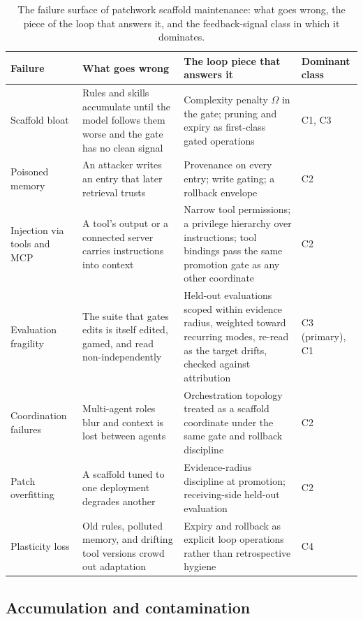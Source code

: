 \begin{table}[h]
\centering\small
\begin{tabular}{>{\raggedright\arraybackslash}p{}>{\raggedright\arraybackslash}p{}>{\raggedright\arraybackslash}p{}>{\raggedright\arraybackslash}p{}}
\toprule
Failure & What goes wrong & The loop piece that answers it & Dominant class \\
\midrule
Scaffold bloat & Rules and skills accumulate until the model follows them worse and the gate has no clean signal & Complexity penalty $\Omega$ in the gate; pruning and expiry as first-class gated operations & C1, C3 \\
Poisoned memory & An attacker writes an entry that later retrieval trusts & Provenance on every entry; write gating; a rollback envelope & C2 \\
Injection via tools and MCP & A tool's output or a connected server carries instructions into context & Narrow tool permissions; a privilege hierarchy over instructions; tool bindings pass the same promotion gate as any other coordinate & C2 \\
Evaluation fragility & The suite that gates edits is itself edited, gamed, and read non-independently & Held-out evaluations scoped within evidence radius, weighted toward recurring modes, re-read as the target drifts, checked against attribution & C3 (primary), C1 \\
Coordination failures & Multi-agent roles blur and context is lost between agents & Orchestration topology treated as a scaffold coordinate under the same gate and rollback discipline & C2 \\
Patch overfitting & A scaffold tuned to one deployment degrades another & Evidence-radius discipline at promotion; receiving-side held-out evaluation & C2 \\
Plasticity loss & Old rules, polluted memory, and drifting tool versions crowd out adaptation & Expiry and rollback as explicit loop operations rather than retrospective hygiene & C4 \\
\bottomrule
\end{tabular}
\caption{The failure surface of patchwork scaffold maintenance: what goes wrong, the piece of the loop that answers it, and the feedback-signal class in which it dominates.}
\label{tab:failures}
\end{table}

\subsection{Accumulation and contamination}\label{accumulation-and-contamination}

